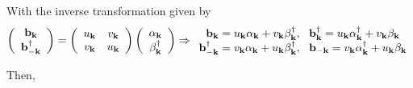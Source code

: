With the inverse transformation given by 
\begin{equation}
    \left( \begin{array}{c}
     {\bf b}_{{\bf k}} \\
     {\bf b}_{{\bf -k}}^\dagger
\end{array} \right) = \left(\begin{array}{cc}
   u_{{\bf k}} & v_{{\bf k}} \\
   v_{{\bf k}} & u_{{\bf k}}
\end{array} \right) \left(\begin{array}{c}
   \alpha_{{\bf k}}\\
   \beta_{{\bf k}}^\dagger
\end{array} \right) \Rightarrow \begin{array}{c}
     {\bf b}_{{\bf k}} = u_{{\bf k}} \alpha_{{\bf k}}  + v_{{\bf k}} \beta_{{\bf k}}^\dagger, \textnormal{ } \textnormal{ } {\bf b}_{{\bf k}}^\dagger = u_{{\bf k}} \alpha_{{\bf k}}^\dagger + v_{{\bf k}} \beta_{{\bf k}} \\
     {\bf b}_{{\bf -k}}^\dagger = v_{{\bf k}} \alpha_{{\bf k}}  + u_{{\bf k}} \beta_{{\bf k}}^\dagger, \textnormal{ } \textnormal{ } {\bf b}_{{-\bf k}} = v_{{\bf k}} \alpha_{{\bf k}}^\dagger + u_{{\bf k}} \beta_{{\bf k}}
\end{array}
\end{equation}

Then,


